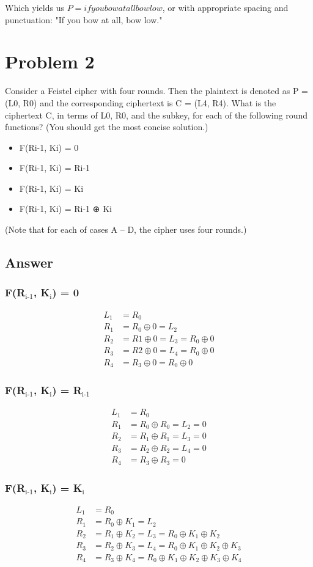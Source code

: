 \documentclass[11pt]{article}
\begin{document}
Which yields us $P = ifyoubowatallbowlow$, or with appropriate
spacing and punctuation: "If you bow at all, bow low."
\section{Problem 2}
\label{sec-2}
Consider a Feistel cipher with four rounds. Then the plaintext is
denoted as P = (L0, R0) and the corresponding ciphertext is C = (L4,
R4). What is the ciphertext C, in terms of L0, R0, and the subkey, for
each of the following round functions? (You should get the most
concise solution.)
\begin{itemize}
\item F(Ri-1, Ki) = 0
\item F(Ri-1, Ki) = Ri-1
\item F(Ri-1, Ki) = Ki
\item F(Ri-1, Ki) = Ri-1 ⊕ Ki
\end{itemize}
(Note        that for each of cases A – D, the cipher uses four rounds.)
\subsection{Answer}
\label{sec-2-1}
\subsubsection{F(R$_{\text{i-1}}$, K$_{\text{i}}$) = 0}
\label{sec-2-1-1}
\begin{align*}
L_1 &= R_0 \\
R_1 &= R_0 \oplus 0 = L_2 \\
R_2 &= R1 \oplus 0 = L_3 = R_0 \oplus 0 \\
R_3 &= R2 \oplus 0 = L_4 = R_0 \oplus 0 \\
R_4 &= R_3 \oplus 0 = R_0 \oplus 0
\end{align*}
\subsubsection{F(R$_{\text{i-1}}$, K$_{\text{i}}$) = R$_{\text{i-1}}$}
\label{sec-2-1-2}
\begin{align*}
L_1 &= R_0 \\
R_1 &= R_0 \oplus R_0 = L_2 = 0 \\
R_2 &= R_1 \oplus R_1 = L_3 = 0 \\
R_3 &= R_2 \oplus R_2 = L_4 = 0\\
R_4 &= R_3 \oplus R_3 = 0
\end{align*}
\subsubsection{F(R$_{\text{i-1}}$, K$_{\text{i}}$) = K$_{\text{i}}$}
\label{sec-2-1-3}
\begin{align*}
L_1 &= R_0 \\
R_1 &= R_0 \oplus K_1 = L_2 \\
R_2 &= R_1 \oplus K_2 = L_3 = R_0 \oplus K_1 \oplus K_2 \\
R_3 &= R_2 \oplus K_3 = L_4 = R_0 \oplus K_1 \oplus K_2 \oplus K_3 \\
R_4 &= R_3 \oplus K_4 = R_0 \oplus K_1 \oplus K_2 \oplus K_3 \oplus K_4
\end{align*}
\end{document}
